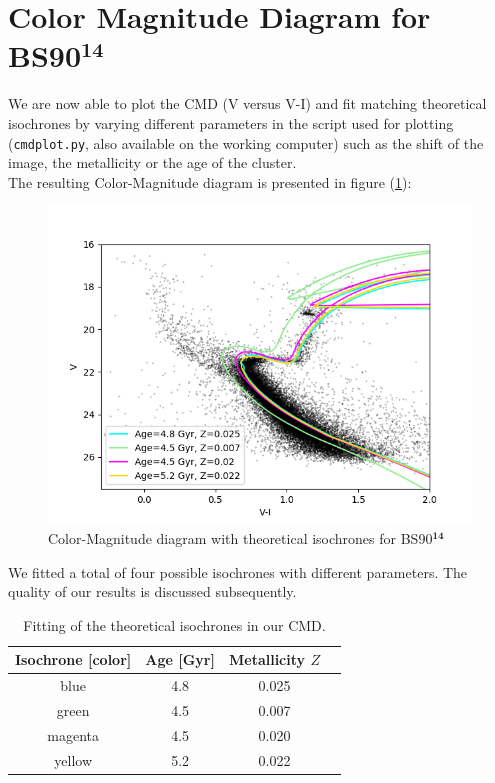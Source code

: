 \section{Color Magnitude Diagram for BS90$^{\mathbf{14}}$ }
We are now able to plot the CMD (V versus V-I) and fit matching theoretical isochrones by varying different parameters in the script used for plotting (\texttt{cmdplot.py}, also available on the working computer) such as the shift of the image, the metallicity or the age of the cluster. \\
The resulting Color-Magnitude diagram is presented in figure (\ref{fig:CMD}):
\begin{figure}[H]
	\centering
	\includegraphics[scale=0.6]{figures/Plots/CMD.png}
	\caption{Color-Magnitude diagram with theoretical isochrones for BS90$^{\mathbf{14}}$}\label{fig:CMD}
\end{figure}

We fitted a total of four possible isochrones with different parameters. The quality of our results is discussed subsequently.

\begin{table}[H]
\setlength{\tabcolsep}{5mm}
\setlength\extrarowheight{2mm}
\centering
\begin{tabular}{c| c c c}

Isochrone [color] & Age [Gyr] & Metallicity $Z$ \\ \hline 

blue & 4.8 & 0.025  \\
green & 4.5 & 0.007  \\
magenta & 4.5 & 0.020  \\
yellow & 5.2 & 0.022  \\

\end{tabular}
\caption{Fitting of the theoretical isochrones in our CMD.}
\label{tab: CMD}
\end{table}

